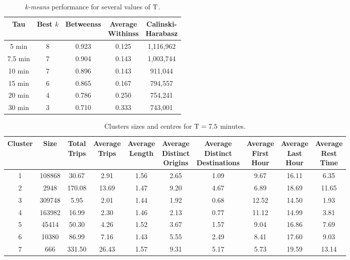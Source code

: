 \begin{table}[t]
\centering
\tabcolsep=0.17cm
\begin{tabular}{c c c c c}
  \hline
Tau & Best $k$ & Betweenss & \thead{Average\\Withinss} & \thead{Calinski-\\Harabasz} \\
  \hline
5 min &   8 & 0.923 & 0.125 & 1,116,962 \\
  7.5 min &   7 & 0.904 & 0.143 & 1,003,744 \\
  10 min&   7 & 0.896 & 0.143 &   911,044 \\
  15 min &   6 & 0.865 & 0.167 &   794,557 \\
  20 min &   4 & 0.786 & 0.250 &   754,241 \\
  30 min &   3 & 0.710 & 0.333 &   743,001 \\
   \hline
\end{tabular}
\caption{\emph{k-means} performance for several values of $\mathrm{T}$.}
\label{t:tau_comparison}
\end{table}

\begin{table*}[t]
\centering
\small
\begin{tabular}{c c c c c c c c c c}
  \hline
 Cluster &  Size & \thead{Total\\Trips} & \thead{Average\\Trips} & \thead{Average\\Length} & \thead{Average\\Distinct\\Origins} & \thead{Average\\Distinct\\Destinations} & \thead{Average\\First\\Hour} & \thead{Average\\Last\\Hour} & \thead{Average\\Rest\\Time} \\
  \hline
  1 & 108868 & 30.67 & 2.91 & 1.56 & 2.65 & 1.09 & 9.67 & 16.11 & 6.35 \\
  2 & 2948 & 170.08 & 13.69 & 1.47 & 9.20 & 4.67 & 6.89 & 18.69 & 11.65 \\
  3 & 309748 & 5.95 & 2.01 & 1.44 & 1.92 & 0.68 & 12.52 & 14.50 & 1.93 \\
  4 & 163982 & 16.99 & 2.30 & 1.46 & 2.13 & 0.77 & 11.12 & 14.99 & 3.81 \\
  5 & 45414 & 50.30 & 4.26 & 1.52 & 3.67 & 1.57 & 9.04 & 16.86 & 7.69 \\
  6 & 10380 & 86.99 & 7.16 & 1.43 & 5.55 & 2.49 & 8.41 & 17.60 & 9.03 \\
  7 & 666 & 331.50 & 26.43 & 1.57 & 9.31 & 5.17 & 5.73 & 19.59 & 13.14 \\
   \hline
\end{tabular}
\caption{Clusters sizes and centres for $\mathrm{T} = 7.5$ minutes.}
\label{t:kmeans_centers_450}
\end{table*}

